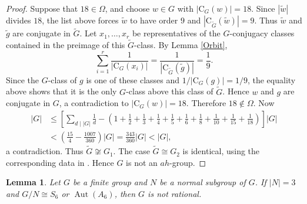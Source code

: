 \documentclass[11pt]{article}
\providecommand{\C}{{\mathrm{C}}}
\providecommand{\Aut}{{\operatorname{Aut}}}
\newtheorem{lem}{Lemma}
\begin{document}
\begin{proof}
      Suppose that $18\in\Omega$, and choose $w\in G$ with $|\C_G(w)|=18$.
      Since $|\widetilde w|$ divides $18$, the list above forces
      $\widetilde w$ to have order $9$ and
      $|\C_{\widetilde G}(\widetilde w)|=9$. Thus $\widetilde w$ and
      $\widetilde g$ are conjugate in $\widetilde G$. Let
      $x_1,\ldots,x_r$ be representatives of the $G$-conjugacy classes
      contained in the preimage of this $\widetilde G$-class. By Lemma
      \ref{Orbit},
      \[
          \sum_{i=1}^{r}\frac{1}{|\C_G(x_i)|}
          =
          \frac{1}{|\C_{\widetilde G}(\widetilde g)|}
          =
          \frac{1}{9}.
      \]
      Since the $G$-class of $g$ is one of these classes and
      $1/|\C_G(g)|=1/9$, the equality above shows that it is the only
      $G$-class above this class of $\widetilde G$. Hence $w$ and $g$ are
      conjugate in $G$, a contradiction to $|\C_G(w)|=18$.
      Therefore $18\notin\Omega$.
      Now
      \[
      \begin{aligned}
          |G|
          &\leq
          [
          \sum_{d\mid |G|}\frac1d
          -
          (
          1+\frac12+\frac13+\frac14+\frac15+\frac16+\frac18
          +\frac1{10}+\frac1{15}+\frac1{18}
          )]|G| \\
          &<
          (
          \frac{15}{4}-\frac{1007}{360}
          )|G|
          =
          \frac{343}{360}|G|
          <|G|,
      \end{aligned}
      \]
      a contradiction. Thus $\widetilde G\not\cong G_1$. The case
      $\widetilde G\cong G_2$ is identical, using the corresponding data
      in
      \cite[Code 6]{Git}. Hence $G$ is not an $ah$-group.
  \end{proof}


\begin{lem}
\label{real3auta6}
    Let $G$ be a finite group and $N$ be a normal subgroup of $G$.
    If $|N|=3$ and $G/N\cong S_6$ or $\Aut(A_6)$, then $G$ is not rational.
\end{lem}
\end{document}
